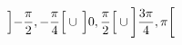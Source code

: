 \begin{displaymath}
 \left] -\frac{\pi}{2} , -\frac{\pi}{4}\right[ \cup   \\
\left] 0 , \frac{\pi}{2}\right[ \cup 
\left] \frac{3\pi}{4} , \pi\right[
\end{displaymath}
